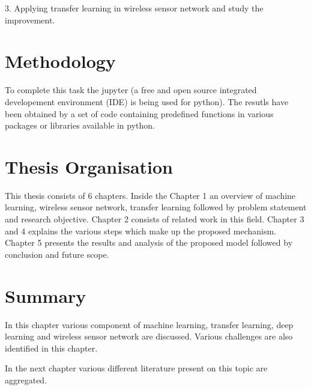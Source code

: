 3. Applying transfer learning in wireless sensor network and study the improvement. \\

\section{Methodology}
To complete this task the jupyter (a free and open source integrated developement environment (IDE) is being used for python). The resutls have been obtained by a set of code containing predefined functions in various packages or libraries available in python.


\section{Thesis Organisation}
This thesis consists of 6 chapters. Inside the Chapter 1 an overview of machine learning, wireless sensor network, transfer learning followed by problem statement and research objective. Chapter 2 consists of related work in this field. Chapter 3 and 4 explains the various steps which make up the proposed mechanism. Chapter 5 presents the results and analysis of the proposed model followed by conclusion and future scope.

\section{Summary}
In this chapter various component of machine learning, transfer learning, deep learning and wireless sensor network are discussed. 
Various challenges are also identified in this chapter.

In the next chapter various different literature present on this topic are aggregated.
